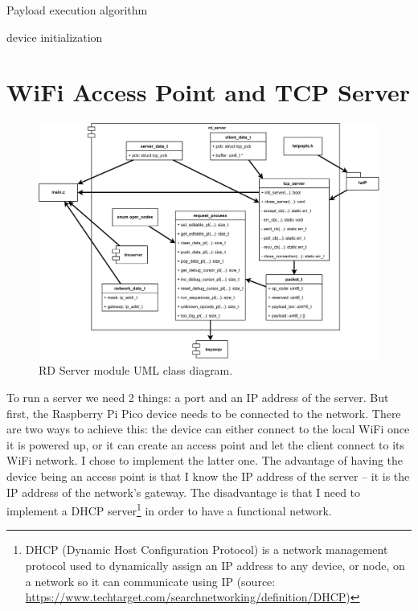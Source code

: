 \begin{algorithm}
\caption{Payload execution algorithm}
\label{alg:payload_exec}
\BlankLine
device initialization\;
\end{algorithm}

\section{WiFi Access Point and TCP Server}
\begin{figure}[ht]
    \centering
    \includegraphics[width=\linewidth]{./obrazky-figures/rd_server_module.pdf}
    \caption{RD Server module UML class diagram.}
    \label{fig:rd_server_module}
\end{figure}
To run a server we need 2 things: a port and an IP address of the server. But first, the Raspberry Pi Pico device needs to be connected to the network. There are two ways to achieve this: the device can either connect to the local WiFi once it is powered up, or it can create an access point and let the client connect to its WiFi network. I chose to implement the latter one. The advantage of having the device being an access point is that I know the IP address of the server \--- it is the IP address of the network's gateway. The disadvantage is that I need to implement a DHCP server\footnote{DHCP (Dynamic Host Configuration Protocol) is a network management protocol used to dynamically assign an IP address to any device, or node, on a network so it can communicate using IP (source: \url{https://www.techtarget.com/searchnetworking/definition/DHCP})} in order to have a functional network.

